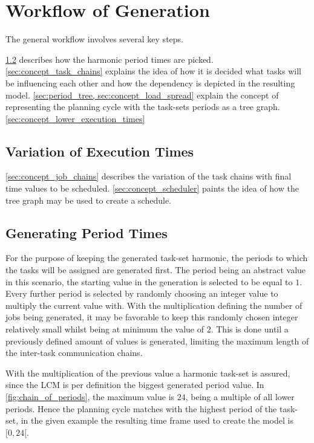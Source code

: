 \cite{dar-tzenpengAssignmentSchedulingCommunicating1997}


\section{Workflow of Generation}\label{sec:concept}
The general workflow involves several key steps.

\cref{sec:generating_period_times} describes how the harmonic period times are picked.
\cref{sec:concept_task_chains} explains the idea of how it is decided what tasks will be influencing each other and how the dependency is depicted in the resulting model.
\cref{sec:period_tree, sec:concept_load_spread} explain the concept of representing the planning cycle with the task-sets periods as a tree graph.
\cref{sec:concept_lower_execution_times} \subsection{Variation of Execution Times}
\cref{sec:concept_job_chains} describes the variation of the task chains with final time values to be scheduled.
\cref{sec:concept_scheduler} paints the idea of how the tree graph may be used to create a schedule.

\subsection{Generating Period Times}\label{sec:generating_period_times}
For the purpose of keeping the generated task-set harmonic, the periods to which the tasks will be assigned are generated first.
The period being an abstract value in this scenario, the starting value in the generation is selected to be equal to $1$.
Every further period is selected by randomly choosing an integer value to multiply the current value with.
With the multiplication defining the number of jobs being generated, it may be favorable to keep this randomly chosen integer relatively small whilst being at minimum the value of $2$. 
This is done until a previously defined amount of values is generated, limiting the maximum length of the inter-task communication chains.

With the multiplication of the previous value a harmonic task-set is assured, since the \ac{LCM} is per definition the biggest generated period value.
In \cref{fig:chain_of_periods}, the maximum value is $24$, being a multiple of all lower periods.
Hence the planning cycle matches with the highest period of the task-set, in the given example the resulting time frame used to create the model is $[0,24[$.

